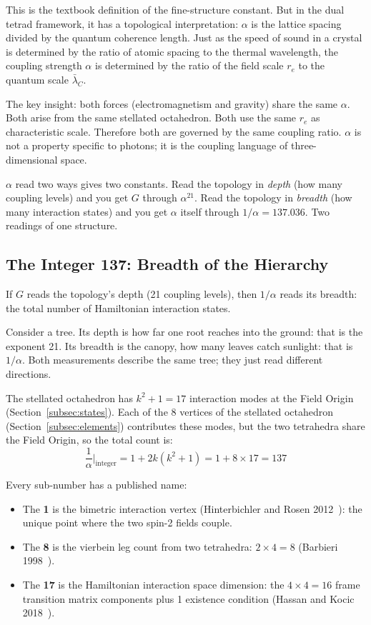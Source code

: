 \documentclass[aps,prd,preprint,superscriptaddress,showpacs,preprintnumbers,amsmath,amssymb,nofootinbib]{revtex4-2}
\begin{document}
This is the textbook definition of the fine-structure constant. But in the dual tetrad framework, it has a topological interpretation: $\alpha$ is the lattice spacing divided by the quantum coherence length. Just as the speed of sound in a crystal is determined by the ratio of atomic spacing to the thermal wavelength, the coupling strength $\alpha$ is determined by the ratio of the field scale $r_e$ to the quantum scale $\bar{\lambda}_C$.

The key insight: both forces (electromagnetism and gravity) share the same $\alpha$. Both arise from the same stellated octahedron. Both use the same $r_e$ as characteristic scale. Therefore both are governed by the same coupling ratio. $\alpha$ is not a property specific to photons; it is the coupling language of three-dimensional space.

$\alpha$ read two ways gives two constants. Read the topology in \emph{depth} (how many coupling levels) and you get $G$ through $\alpha^{21}$. Read the topology in \emph{breadth} (how many interaction states) and you get $\alpha$ itself through $1/\alpha = 137.036$. Two readings of one structure.

\subsection{The Integer 137: Breadth of the Hierarchy}
\label{subsec:breadth}

If $G$ reads the topology's depth (21 coupling levels), then $1/\alpha$ reads its breadth: the total number of Hamiltonian interaction states.

Consider a tree. Its depth is how far one root reaches into the ground: that is the exponent 21. Its breadth is the canopy, how many leaves catch sunlight: that is $1/\alpha$. Both measurements describe the same tree; they just read different directions.

The stellated octahedron has $k^2 + 1 = 17$ interaction modes at the Field Origin (Section~\ref{subsec:states}). Each of the 8 vertices of the stellated octahedron (Section~\ref{subsec:elements}) contributes these modes, but the two tetrahedra share the Field Origin, so the total count is:
\begin{equation}
\frac{1}{\alpha}\bigg|_{\text{integer}} = 1 + 2k(k^2 + 1) = 1 + 8 \times 17 = 137
\label{eq:137}
\end{equation}

Every sub-number has a published name:
\begin{itemize}
\item The \textbf{1} is the bimetric interaction vertex (Hinterbichler and Rosen 2012~\cite{hinterbichler2012}): the unique point where the two spin-2 fields couple.
\item The \textbf{8} is the vierbein leg count from two tetrahedra: $2 \times 4 = 8$ (Barbieri 1998~\cite{barbieri1998}).
\item The \textbf{17} is the Hamiltonian interaction space dimension: the $4 \times 4 = 16$ frame transition matrix components plus 1 existence condition (Hassan and Kocic 2018~\cite{hassankocic2018}).
\end{itemize}
\end{document}
